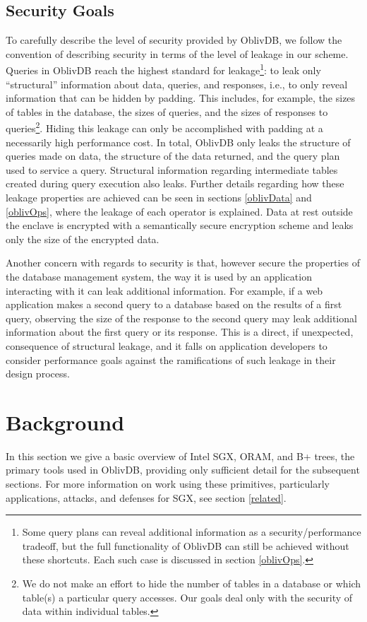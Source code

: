\documentclass[conference]{IEEEtran}
\def\name/{OblivDB}
\begin{document}
\subsection{Security Goals}
To carefully describe the level of security provided by \name/, we follow the convention \cite{FVY+17} of describing security in terms of the level of leakage in our scheme. Queries in \name/ reach the highest standard for leakage\footnote{Some query plans can reveal additional information as a security/performance tradeoff, but the full functionality of \name/ can still be achieved without these shortcuts. Each such case is discussed in section \ref{oblivOps}.}: to leak only ``structural'' information about data, queries, and responses, i.e., to only reveal information that can be hidden by padding. This includes, for example, the sizes of tables in the database, the sizes of queries, and the sizes of responses to queries\footnote{We do not make an effort to hide the number of tables in a database or which table(s) a particular query accesses. Our goals deal only with the security of data within individual tables.}. Hiding this leakage can only be accomplished with padding at a necessarily high performance cost. In total, \name/ only leaks the structure of queries made on data, the structure of the data returned, and the query plan used to service a query. Structural information regarding intermediate tables created during query execution also leaks. Further details regarding how these leakage properties are achieved can be seen in sections \ref{oblivData} and \ref{oblivOps}, where the leakage of each operator is explained. Data at rest outside the enclave is encrypted with a semantically secure encryption scheme and leaks only the size of the encrypted data. 

Another concern with regards to security is that, however secure the properties of the database management system, the way it is used by an application interacting with it can leak additional information. For example, if a web application makes a second query to a database based on the results of a first query, observing the size of the response to the second query may leak additional information about the first query or its response. This is a direct, if unexpected, consequence of structural leakage, and it falls on application developers to consider performance goals against the ramifications of such leakage in their design process. 

\section{Background}\label{background}
In this section we give a basic overview of Intel SGX, ORAM, and B+ trees, the primary tools used in \name/, providing only sufficient detail for the subsequent sections. For more information on work using these primitives, particularly applications, attacks, and defenses for SGX, see section \ref{related}.
\end{document}
